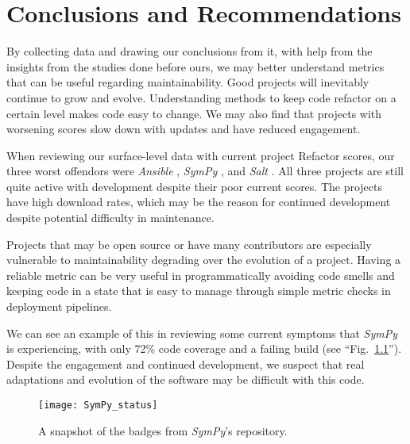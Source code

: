 \chapter{Conclusions and Recommendations} \label{chapterConclusion}



By collecting data and drawing our conclusions from it, with help from the insights from the studies done before ours, we may better understand metrics that can be useful regarding maintainability. Good projects will inevitably continue to grow and evolve. Understanding methods to keep code refactor on a certain level makes code easy to change. We may also find that projects with worsening scores slow down with updates and have reduced engagement.

When reviewing our surface-level data with current project Refactor scores, our three worst offendors were \emph{Ansible} \cite{data:ansible}, \emph{SymPy} \cite{data:sympy}, and \emph{Salt} \cite{data:salt}. All three projects are still quite active with development despite their poor current scores. The projects have high download rates, which may be the reason for continued development despite potential difficulty in maintenance. 

Projects that may be open source or have many contributors are especially vulnerable to maintainability degrading over the evolution of a project. Having a reliable metric can be very useful in programmatically avoiding code smells and keeping code in a state that is easy to manage through simple metric checks in deployment pipelines.

We can see an example of this in reviewing some current symptoms that \emph{SymPy} is experiencing, with only 72\% code coverage and a failing build (see ``Fig.~\ref{figSymPyStatus}''). Despite the engagement and continued development, we suspect that real adaptations and evolution of the software may be difficult with this code.

\begin{figure}[ht]
    \centerline{
        \texttt{[image: SymPy\_status]}
    }
    \caption{A snapshot of the badges from \emph{SymPy}'s repository.}
    \label{figSymPyStatus}
\end{figure}

